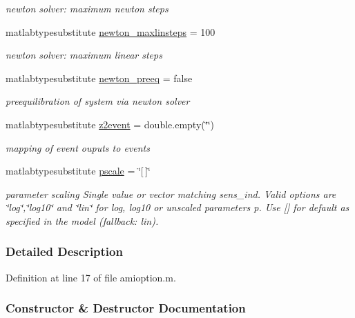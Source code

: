 \begin{DoxyCompactItemize}
\begin{DoxyCompactList}\small\item\em newton solver\+: maximum newton steps \end{DoxyCompactList}\item 
matlabtypesubstitute \mbox{\hyperlink{classamioption_abea544569240b7cfcb1505d125a3b51b}{newton\+\_\+maxlinsteps}} = 100
\begin{DoxyCompactList}\small\item\em newton solver\+: maximum linear steps \end{DoxyCompactList}\item 
matlabtypesubstitute \mbox{\hyperlink{classamioption_a6f07b6b706ac3305e478f576747ad088}{newton\+\_\+preeq}} = false
\begin{DoxyCompactList}\small\item\em preequilibration of system via newton solver \end{DoxyCompactList}\item 
matlabtypesubstitute \mbox{\hyperlink{classamioption_a7a7be015feeb7a346dceccd49e622b4b}{z2event}} = double.\+empty(\char`\"{}\char`\"{})
\begin{DoxyCompactList}\small\item\em mapping of event ouputs to events \end{DoxyCompactList}\item 
matlabtypesubstitute \mbox{\hyperlink{classamioption_a4dc67beb394b49ebeccf6a99dd932ee3}{pscale}} = \char`\"{}\mbox{[}$\,$\mbox{]}\char`\"{}
\begin{DoxyCompactList}\small\item\em parameter scaling Single value or vector matching sens\+\_\+ind. Valid options are \char`\"{}log\char`\"{},\char`\"{}log10\char`\"{} and \char`\"{}lin\char`\"{} for log, log10 or unscaled parameters p. Use \mbox{[}\mbox{]} for default as specified in the model (fallback\+: {\ttfamily lin}). \end{DoxyCompactList}\end{DoxyCompactItemize}


\subsubsection{Detailed Description}


Definition at line 17 of file amioption.\+m.



\subsubsection{Constructor \& Destructor Documentation}
\mbox{\label{classamioption_a86c655c4010c1c2ddb3e68693a07ef37}} 
